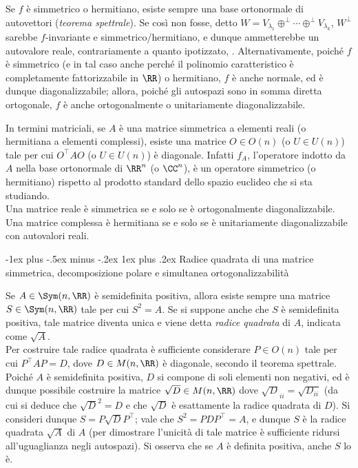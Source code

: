 \documentclass[10pt,landscape]{article}
\makeatletter
\renewcommand{\subsubsection}{\@startsection{subsubsection}{3}{0mm}%
	{-1ex plus -.5ex minus -.2ex}%
	{1ex plus .2ex}%
	{\normalfont\small\bfseries}}
\makeatother
\begin{document}
\begin{multicols}{3}
		Se $f$ è simmetrico o hermitiano, esiste sempre una
		base ortonormale di autovettori (\textit{teorema spettrale}). Se così non fosse, detto $W = V_{\lambda_1} \oplus^\perp \cdots \oplus^\perp V_{\lambda_k}$, $W^\perp$ sarebbe $f$-invariante e simmetrico/hermitiano, e dunque ammetterebbe un autovalore reale, contrariamente a quanto ipotizzato, \Lightning. Alternativamente, poiché
		$f$ è simmetrico (e in tal caso anche perché il
		polinomio caratteristico è completamente fattorizzabile in $\RR$) o hermitiano, $f$ è anche
		normale, ed è dunque diagonalizzabile; allora, poiché gli autospazi sono in somma diretta ortogonale, $f$ è anche ortogonalmente o unitariamente diagonalizzabile. \\ \vskip 0.05in
		
		In termini matriciali, se $A$ è una matrice
		simmetrica a elementi reali (o hermitiana a elementi complessi), esiste una matrice $O \in O(n)$ (o $U \in U(n)$) tale per cui $O^\top A O$ (o $U \in U(n)$) è diagonale. Infatti $f_A$, l'operatore
		indotto da $A$ nella base ortonormale di $\RR^n$ (o $\CC^n$), è un operatore simmetrico (o hermitiano) rispetto al prodotto standard dello
		spazio euclideo che si sta studiando. \\
		
		Una matrice reale è simmetrica se e solo se è ortogonalmente diagonalizzabile.
		Una matrice complessa è hermitiana se e solo se è unitariamente diagonalizzabile
		con autovalori reali.
		
		\subsubsection{Radice quadrata di una matrice simmetrica, decomposizione polare e simultanea ortogonalizzabilità}
		
		Se $A \in \Sym(n, \RR)$ è semidefinita positiva, allora
		esiste sempre una matrice $S \in \Sym(n, \RR)$ tale
		per cui $S^2 = A$. Se si suppone anche che $S$ è
		semidefinita positiva, tale matrice diventa unica e
		viene detta \textit{radice quadrata} di $A$, indicata come $\sqrt{A}$. \\
		
		Per costruire tale radice quadrata è sufficiente
		considerare $P \in O(n)$ tale per cui
		$P^\top A P = D$, dove $D \in M(n, \RR)$ è
		diagonale, secondo il teorema spettrale. Poiché $A$ è semidefinita positiva, $D$
		si compone di soli elementi non negativi, ed è
		dunque possibile costruire la matrice $\sqrt{D} \in M(n, \RR)$ dove $\sqrt{D}_{ii} = \sqrt{D_{ii}}$ (da cui si deduce che $\sqrt{D}^2 = D$ e che $\sqrt{D}$ è esattamente la radice quadrata di $D$).
		Si consideri dunque $S = P \sqrt{D} P^\top$; vale
		che $S^2 = P D P^\top = A$, e dunque $S$ è la
		radice quadrata $\sqrt{A}$ di $A$ (per dimostrare l'unicità di tale matrice è sufficiente ridursi all'uguaglianza negli autospazi). Si osserva che
		se $A$ è definita positiva, anche $S$ lo è. \\ \vskip 0.05in
		

\end{multicols}
\end{document}
